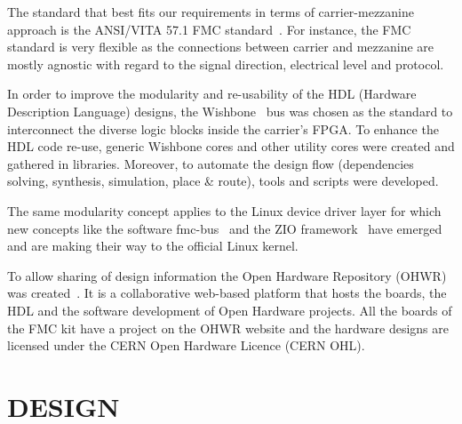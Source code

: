 \documentclass{JAC2003}
\begin{document}

The standard that best fits our requirements in terms of carrier-mezzanine approach is the ANSI/VITA 57.1 FMC standard~\cite{fmc}.
For instance, the FMC standard is very flexible as the connections between carrier and mezzanine are mostly agnostic with regard to the signal direction, electrical level and protocol.

In order to improve the modularity and re-usability of the HDL (Hardware Description Language) designs, the Wishbone~\cite{wishbone} bus was chosen as the standard to interconnect the diverse logic blocks inside the carrier's FPGA.
To enhance the HDL code re-use, generic Wishbone cores and other utility cores were created and gathered in libraries.
Moreover, to automate the design flow (dependencies solving, synthesis, simulation, place \& route), tools and scripts were developed.

The same modularity concept applies to the Linux device driver layer for which new concepts like the software fmc-bus~\cite{fmc-bus} and the ZIO framework~\cite{zio} have emerged and are making their way to the official Linux kernel.

To allow sharing of design information the Open Hardware Repository (OHWR) was created~\cite{icalepcs}.
It is a collaborative web-based platform that hosts the boards, the HDL and the software development of Open Hardware projects.
All the boards of the FMC kit have a project on the OHWR website and the hardware designs are licensed under the CERN Open Hardware Licence (CERN OHL).

\section{DESIGN}
\end{document}
